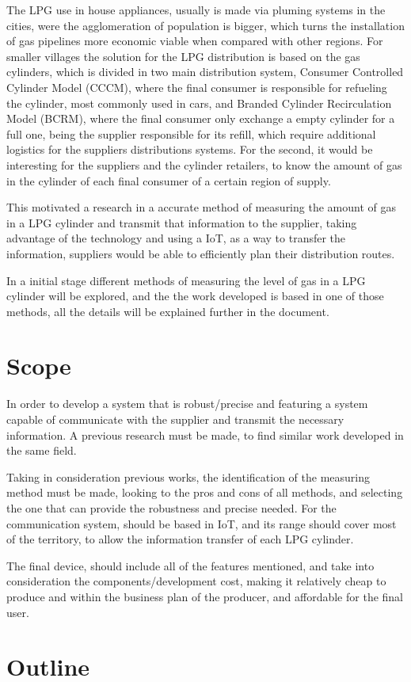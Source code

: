 The LPG use in house appliances, usually is made via pluming systems in the cities, were the agglomeration of population is bigger, which turns the installation of gas pipelines more economic viable when compared with other regions. For smaller villages the solution for the LPG distribution is based on the gas cylinders, which is divided in two main distribution system, Consumer Controlled Cylinder Model (CCCM), where the final consumer is responsible for refueling the cylinder, most commonly used in cars, and Branded Cylinder Recirculation Model (BCRM), where the final consumer only exchange a empty cylinder for a full one, being the supplier responsible for its refill, which require additional logistics for the suppliers distributions systems. For the second, it would be interesting for the suppliers and the cylinder retailers, to know the amount of gas in the cylinder of each final consumer of a certain region of supply.

This motivated a research in a accurate method of measuring the amount of gas in a LPG cylinder and transmit that information to the supplier, taking advantage of the technology and using a IoT, as a way to transfer the information, suppliers would be able to efficiently plan their distribution routes. 

In a initial stage different methods of measuring the level of gas in a LPG cylinder will be explored, and the the work developed is based in one of those methods, all the details will be explained further in the document.

\section{Scope}
In order to develop a system that is robust/precise and featuring a system capable of communicate with the supplier and transmit the necessary information. A previous research must be made, to find similar work developed in the same field.

Taking in consideration previous works, the identification of the measuring method must be made, looking to the pros and cons of all methods, and selecting the one that can provide the robustness and precise needed. For the communication system, should be based in IoT, and its range should cover most of the territory, to allow the information transfer of each LPG cylinder.

The final device, should include all of the features mentioned, and take into consideration the components/development cost, making it relatively cheap to produce and within the business plan of the producer, and affordable for the final user.

\section{Outline}

\clearpage
\printbibliography[heading=subbibliography]
